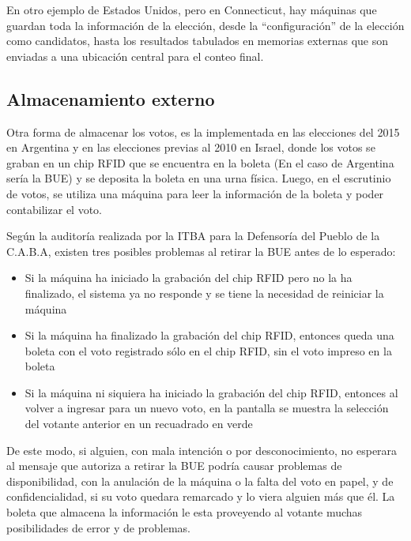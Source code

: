 En otro ejemplo de Estados Unidos, pero en Connecticut, hay máquinas que guardan toda la información de la elección, desde la ``configuración'' de la elección como candidatos, hasta los resultados tabulados en memorias externas que son enviadas a una ubicación central para el conteo final\cite{davtyan:2007}.

\subsection{Almacenamiento externo}

Otra forma de almacenar los votos, es la implementada en las elecciones del 2015 en Argentina y en las elecciones previas al 2010 en Israel, donde los votos se graban en un chip RFID que se encuentra en la boleta (En el caso de Argentina sería la BUE) y se deposita la boleta en una urna física. Luego, en el escrutinio de votos, se utiliza una máquina para leer la información de la boleta y poder contabilizar el voto.

Según la auditoría realizada por la ITBA para la Defensoría del Pueblo de la C.A.B.A\cite{itba}, existen tres posibles problemas al retirar la BUE antes de lo esperado:
\begin{itemize}
	\item Si la máquina ha iniciado la grabación del chip RFID pero no la ha finalizado, el sistema ya no responde y se tiene la necesidad de reiniciar la máquina
	\item Si la máquina ha finalizado la grabación del chip RFID, entonces queda una boleta con el voto registrado sólo en el chip RFID, sin el voto impreso en la boleta
	\item Si la máquina ni siquiera ha iniciado la grabación del chip RFID, entonces al volver a ingresar para un nuevo voto, en la pantalla se muestra la selección del votante anterior en un recuadrado en verde
\end{itemize}

De este modo, si alguien, con mala intención o por desconocimiento, no esperara al mensaje que autoriza a retirar la BUE podría causar problemas de disponibilidad, con la anulación de la máquina o la falta del voto en papel, y de confidencialidad, si su voto quedara remarcado y lo viera alguien más que él. La boleta que almacena la información le esta proveyendo al votante muchas posibilidades de error y de problemas.

